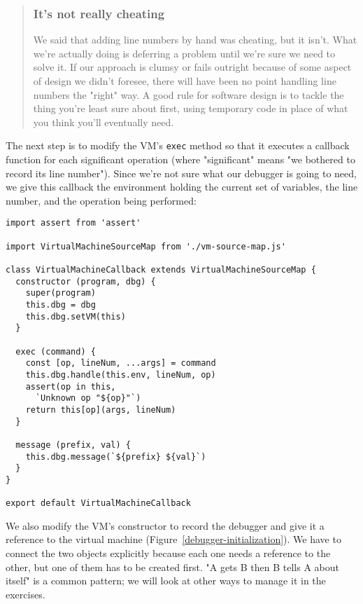 \documentclass[krantzl]{krantz}
\newcommand{\figref}[1]{Figure~\ref{#1}}
\newenvironment{callout}{\savenotes\begin{tBox}\begin{quotation}\toggletrue{inbox}\renewcommand{\thempfootnote}{\arabic{footnote}}}{\end{quotation}\vspace{\baselineskip}\end{tBox}\togglefalse{inbox}\spewnotes}
\begin{document}
\begin{callout}


\subsubsection*{It's not really cheating}


We said that adding line numbers by hand was cheating,
but it isn't.
What we're actually doing is deferring a problem until we're sure we need to solve it.
If our approach is clumsy or fails outright because of some aspect of design we didn't foresee,
there will have been no point handling line numbers the "right" way.
A good rule for software design
is to tackle the thing you're least sure about first,
using temporary code in place of what you think you'll eventually need.

\end{callout}


The next step is to modify the VM's \texttt{exec} method
so that it executes a callback function for each significant operation
(where "significant" means "we bothered to record its line number").
Since we're not sure what our debugger is going to need,
we give this callback the environment holding the current set of variables,
the line number,
and the operation being performed:


\begin{lstlisting}[frame=single,frameround=tttt]
import assert from 'assert'

import VirtualMachineSourceMap from './vm-source-map.js'

class VirtualMachineCallback extends VirtualMachineSourceMap {
  constructor (program, dbg) {
    super(program)
    this.dbg = dbg
    this.dbg.setVM(this)
  }

  exec (command) {
    const [op, lineNum, ...args] = command
    this.dbg.handle(this.env, lineNum, op)
    assert(op in this,
      `Unknown op "${op}"`)
    return this[op](args, lineNum)
  }

  message (prefix, val) {
    this.dbg.message(`${prefix} ${val}`)
  }
}

export default VirtualMachineCallback
\end{lstlisting}



We also modify the VM's constructor to record the debugger and give it a reference to the virtual machine
(\figref{debugger-initialization}).
We have to connect the two objects explicitly
because each one needs a reference to the other,
but one of them has to be created first.
"A gets B then B tells A about itself" is a common pattern;
we will look at other ways to manage it in the exercises.
\end{document}

